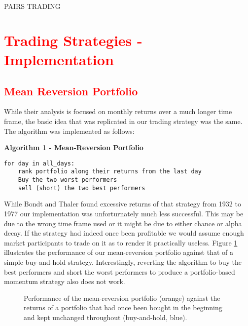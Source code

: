 PAIRS TRADING


\section{\textcolor{red}{Trading Strategies - Implementation}}
\subsection{\textcolor{red}{Mean Reversion Portfolio}}
While their analysis is focused on monthly returns over a much longer time frame, the basic idea that was replicated in our trading strategy was the same. The algorithm was implemented as follows: 

\vspace{2ex}
\textbf{\small{Algorithm 1 - Mean-Reversion Portfolio}}
\vspace{-1ex}
\begin{verbatim}
for day in all_days: 
    rank portfolio along their returns from the last day
    Buy the two worst performers
    sell (short) the two best performers
\end{verbatim}

While Bondt and Thaler found excessive returns of that strategy from 1932 to 1977 our implementation was unforturnately much less successful. This may be due to the wrong time frame used or it might be due to either chance or alpha decay. If the strategy had indeed once been profitable we would assume enough market participants to trade on it as to render it practically useless. Figure \ref{fig:mean reversion} illustrates the performance of our mean-reversion portfolio against that of a simple buy-and-hold strategy. Interestingly, reverting the algorithm to buy the best performers and short the worst performers to produce a portfolio-based momentum strategy also does not work. 

\begin{figure}[h!]
    \centering
    \begin{adjustbox}{width=.95\textwidth,center}
        
    \end{adjustbox}  
    \caption{Performance of the mean-reversion portfolio (orange) against the returns of a portfolio that had once been bought in the beginning and kept unchanged throughout (buy-and-hold, blue).}
    \label{fig:mean reversion}
\end{figure}{}

